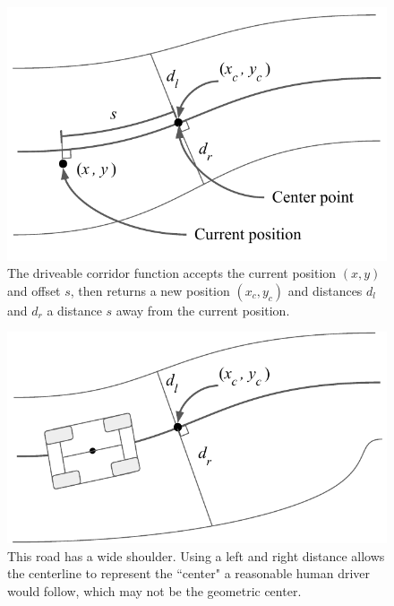 \documentclass[letterpaper, 10 pt, conference]{ieeeconf}  %
\begin{document}
\begin{figure}[h]
	\centering
	\includegraphics[width=0.9\linewidth]{figures/corridor.pdf}
	\caption{The driveable corridor function accepts the current position $(x,y)$ and offset $s$, then returns a new position $(x_c, y_c)$ and distances $d_l$ and $d_r$ a distance $s$ away from the current position.}
	\label{fig:corridor}
\end{figure}

\begin{figure}[h]
	\centering
	\includegraphics[width=0.9\linewidth]{figures/corridor_with_turnout.pdf}
	\caption{This road has a wide shoulder. Using a left and right distance allows the centerline to represent the ``center" a reasonable human driver would follow, which may not be the geometric center.}
	\label{fig:corridor_with_shoulder}
\end{figure}


\end{document}
